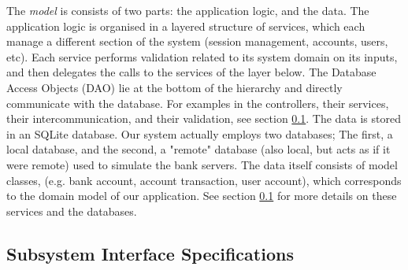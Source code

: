 \documentclass[12pt]{article}
\begin{document}
The \textit{model} is consists of two parts: the application logic, and the data. The application logic is organised in a layered structure of services, which each manage a different section of the system (session management, accounts, users, etc).
Each service performs validation related to its system domain on its inputs, and then delegates the calls to the services of the layer below. The Database Access Objects (DAO) lie  at the bottom of the hierarchy and directly communicate with the database. For examples in the controllers, their services, their intercommunication, and their validation, see section \ref{subsystem interface}.
The data is stored in an SQLite database. Our system actually employs two databases; The first, a local database, and the second, a "remote" database (also local, but acts as if it were remote) used to simulate the bank servers. The data itself consists of model classes, (e.g. bank account, account transaction, user account), which corresponds to the domain model of our application. See section \ref{subsystem interface} for more details on these services and the databases.


\subsection{Subsystem Interface Specifications} \label{subsystem interface}



\end{document}
